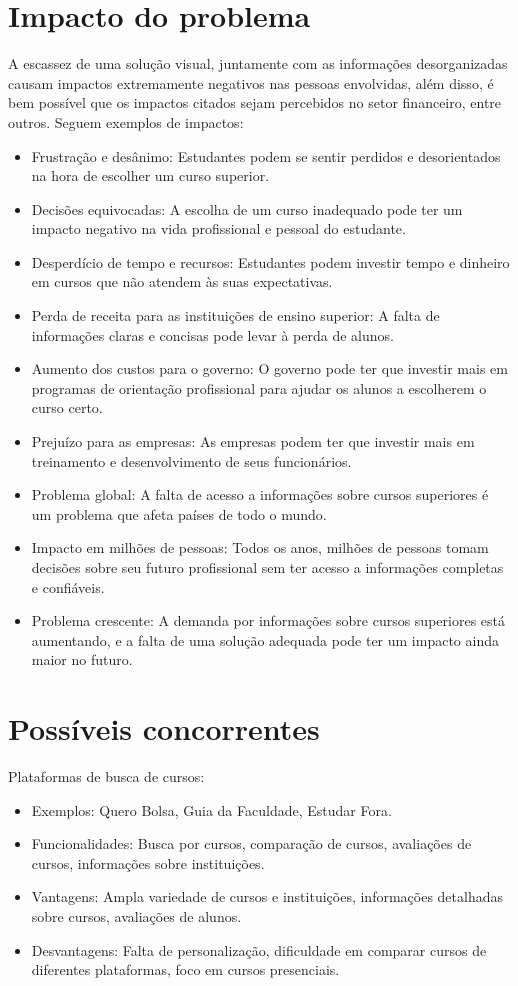 \documentclass[a4paper,12pt]{article}
\begin{document}
\section{Impacto do problema}
A escassez de uma solução visual, juntamente com as informações desorganizadas causam impactos extremamente negativos nas pessoas envolvidas, além disso, é bem possível que os impactos citados sejam percebidos no setor financeiro, entre outros. Seguem exemplos de impactos:
\begin{itemize}
    \item Frustração e desânimo: Estudantes podem se sentir perdidos e desorientados na hora de escolher um curso superior.
    \item Decisões equivocadas: A escolha de um curso inadequado pode ter um impacto negativo na vida profissional e pessoal do estudante.
    \item Desperdício de tempo e recursos: Estudantes podem investir tempo e dinheiro em cursos que não atendem às suas expectativas.
    \item Perda de receita para as instituições de ensino superior: A falta de informações claras e concisas pode levar à perda de alunos.
    \item Aumento dos custos para o governo: O governo pode ter que investir mais em programas de orientação profissional para ajudar os alunos a escolherem o curso certo.
    \item Prejuízo para as empresas: As empresas podem ter que investir mais em treinamento e desenvolvimento de seus funcionários.
    \item Problema global: A falta de acesso a informações sobre cursos superiores é um problema que afeta países de todo o mundo.
    \item Impacto em milhões de pessoas: Todos os anos, milhões de pessoas tomam decisões sobre seu futuro profissional sem ter acesso a informações completas e confiáveis.
    \item Problema crescente: A demanda por informações sobre cursos superiores está aumentando, e a falta de uma solução adequada pode ter um impacto ainda maior no futuro.
\end{itemize}

\section{Possíveis concorrentes}
Plataformas de busca de cursos:
\begin{itemize}
    \item Exemplos: Quero Bolsa, Guia da Faculdade, Estudar Fora.
    \item Funcionalidades: Busca por cursos, comparação de cursos, avaliações de cursos, informações sobre instituições.
    \item Vantagens: Ampla variedade de cursos e instituições, informações detalhadas sobre cursos, avaliações de alunos.
    \item Desvantagens: Falta de personalização, dificuldade em comparar cursos de diferentes plataformas, foco em cursos presenciais.
\end{itemize}
\end{document}
